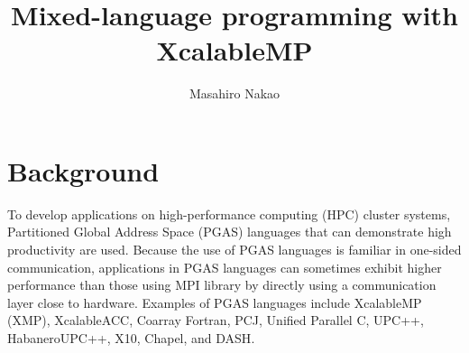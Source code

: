\documentclass[graybox]{svmult}
\begin{document}
\title*{Mixed-language programming with XcalableMP}
\author{Masahiro Nakao}
%
%
\maketitle



\section{Background}
To develop applications on high-performance computing (HPC) cluster systems,
Partitioned Global Address Space (PGAS) languages that can demonstrate high productivity are used\cite{1303318,Katherine,CGPOP2011,doi:10.1177/1094342017698214}.
Because the use of PGAS languages is familiar in one-sided communication,
applications in PGAS languages can sometimes exhibit higher performance than those using MPI library by directly using a communication layer close to hardware\cite{doi:10.1177/1094342017698214,Jose:2010:UUM:2020373.2020378}. 
Examples of PGAS languages include XcalableMP (XMP)\cite{doi:10.1177/1094342017698214,2013nakao,2012nakao,xmp-spec},
XcalableACC\cite{nakao2014,xacc-spec,nakao2017,nakao2019}, Coarray Fortran\cite{Numrich:1998:CFP:289918.289920}, PCJ\cite{pcj}, Unified Parallel C\cite{upc-1.3},
UPC++\cite{upc_plus_plus}, HabaneroUPC++\cite{Kumar:2014:HCP:2676870.2676879}, X10\cite{Charles:2005:XOA:1103845.1094852},
Chapel\cite{Chamberlain:2007:PPC:1286120.1286123}, and DASH\cite{DBLP:journals/corr/FurlingerFK16}.
\end{document}
